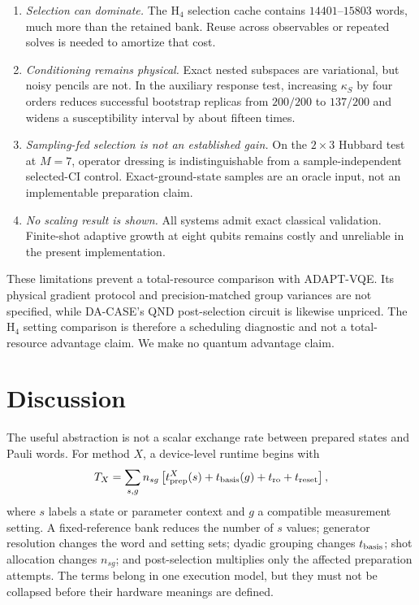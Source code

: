 \documentclass[aps,pra,reprint,superscriptaddress,nofootinbib,floatfix]{revtex4-2}
\begin{document}
\begin{enumerate}
 \item \emph{Selection can dominate.}  The H$_4$ selection cache contains
 \(14401\)--\(15803\) words, much more than the retained bank.  Reuse across
 observables or repeated solves is needed to amortize that cost.
 \item \emph{Conditioning remains physical.}  Exact nested subspaces are
 variational, but noisy pencils are not.  In the auxiliary response test,
 increasing \(\kappa_S\) by four orders reduces successful bootstrap replicas
 from \(200/200\) to \(137/200\) and widens a susceptibility interval by about
 fifteen times.
 \item \emph{Sampling-fed selection is not an established gain.}  On the
 \(2\times3\) Hubbard test at \(M=7\), operator dressing is indistinguishable
 from a sample-independent selected-CI control.  Exact-ground-state samples
 are an oracle input, not an implementable preparation claim.
 \item \emph{No scaling result is shown.}  All systems admit exact classical
 validation.  Finite-shot adaptive growth at eight qubits remains costly and
 unreliable in the present implementation.
\end{enumerate}

These limitations prevent a total-resource comparison with ADAPT-VQE.  Its
physical gradient protocol and precision-matched group variances are not
specified, while DA-CASE's QND post-selection circuit is likewise unpriced.
The H$_4$ setting comparison is therefore a scheduling diagnostic and not a
total-resource advantage claim.  We make no quantum advantage claim.

\section{Discussion}
\label{sec:discussion}

The useful abstraction is not a scalar exchange rate between prepared states
and Pauli words.  For method \(X\), a device-level runtime begins with
\begin{equation}
 T_X=\sum_{s,g} n_{sg}
 \left[t_{\rm prep}^X(s)+t_{\rm basis}(g)+t_{\rm ro}+t_{\rm reset}\right],
 \label{eq:runtime}
\end{equation}
where \(s\) labels a state or parameter context and \(g\) a compatible
measurement setting.  A fixed-reference bank reduces the number of \(s\)
values; generator resolution changes the word and setting sets; dyadic
grouping changes \(t_{\rm basis}\); shot allocation changes \(n_{sg}\); and
post-selection multiplies only the affected preparation attempts.  The terms
belong in one execution model, but they must not be collapsed before their
hardware meanings are defined.
\end{document}
